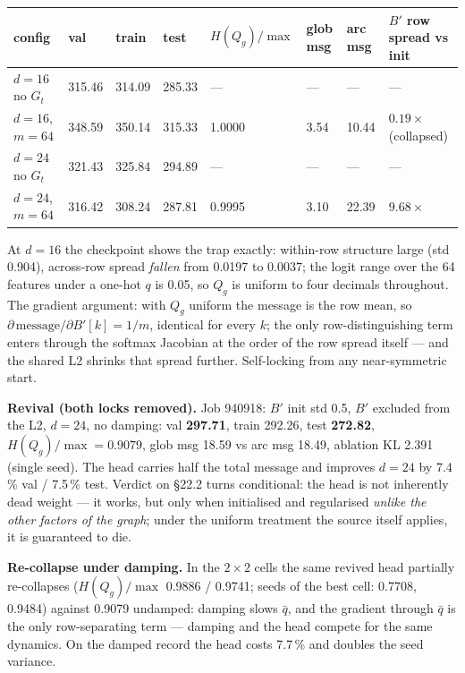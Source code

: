 \documentclass[10pt,a4paper]{article}
\newcommand{\qbar}{\ensuremath{\bar q}}
\begin{document}
\begin{table}[h]\centering\footnotesize
\begin{tabular}{llllllll}
\toprule
config & val & train & test & $H(Q_g)/\max$ & glob msg & arc msg & $B'$ row spread vs init\\
\midrule
$d{=}16$ no $G_t$ & 315.46 & 314.09 & 285.33 & --- & --- & --- & ---\\
$d{=}16$, $m{=}64$ & 348.59 & 350.14 & 315.33 & 1.0000 & 3.54 & 10.44 & $0.19\times$ (collapsed)\\
$d{=}24$ no $G_t$ & 321.43 & 325.84 & 294.89 & --- & --- & --- & ---\\
$d{=}24$, $m{=}64$ & 316.42 & 308.24 & 287.81 & 0.9995 & 3.10 & 22.39 & $9.68\times$\\
\bottomrule
\end{tabular}
\end{table}

At $d{=}16$ the checkpoint shows the trap exactly: within-row structure large (std 0.904),
across-row spread \emph{fallen} from 0.0197 to 0.0037; the logit range over the 64 features
under a one-hot $q$ is 0.05, so $Q_g$ is uniform to four decimals throughout. The gradient
argument: with $Q_g$ uniform the message is the row mean, so
$\partial\,\mathrm{message}/\partial B'[k] = 1/m$, identical for every $k$; the only
row-distinguishing term enters through the softmax Jacobian at the order of the row spread
itself --- and the shared L2 shrinks that spread further. Self-locking from any
near-symmetric start.

\textbf{Revival (both locks removed).} Job 940918: $B'$ init std 0.5, $B'$ excluded from the
L2, $d{=}24$, no damping: val \textbf{297.71}, train 292.26, test \textbf{272.82},
$H(Q_g)/\max = 0.9079$, glob msg 18.59 vs arc msg 18.49, ablation KL 2.391 (single seed).
The head carries half the total message and improves $d{=}24$ by 7.4\,\% val / 7.5\,\% test.
Verdict on \S22.2 turns conditional: the head is not inherently dead weight --- it works,
but only when initialised and regularised \emph{unlike the other factors of the graph};
under the uniform treatment the source itself applies, it is guaranteed to die.

\textbf{Re-collapse under damping.} In the $2\times2$ cells the same revived head partially
re-collapses ($H(Q_g)/\max$ 0.9886 / 0.9741; seeds of the best cell: 0.7708, 0.9484) against
0.9079 undamped: damping slows \qbar{}, and the gradient through \qbar{} is the only
row-separating term --- damping and the head compete for the same dynamics. On the damped
record the head costs 7.7\,\% and doubles the seed variance.
\end{document}

